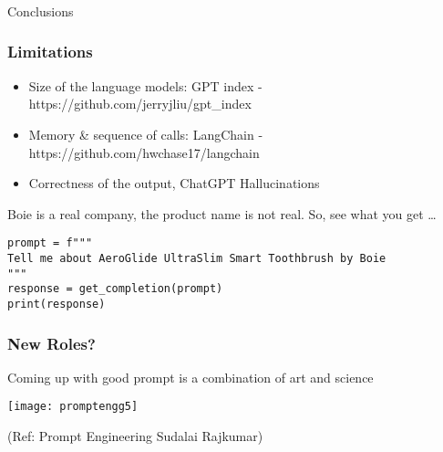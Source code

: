 

\begin{frame}[fragile]\frametitle{}
\begin{center}
{\Large Conclusions}
\end{center}
\end{frame}

\begin{frame}[fragile]\frametitle{Limitations}


\begin{itemize}
\item Size of the language models: GPT index - https://github.com/jerryjliu/gpt\_index
\item Memory \& sequence of calls: LangChain - https://github.com/hwchase17/langchain
\item Correctness of the output, ChatGPT Hallucinations
\end{itemize}	 

Boie is a real company, the product name is not real. So, see what you get \ldots

\begin{lstlisting}
prompt = f"""
Tell me about AeroGlide UltraSlim Smart Toothbrush by Boie
"""
response = get_completion(prompt)
print(response)
\end{lstlisting}	 
		
\end{frame}



\begin{frame}[fragile]\frametitle{New Roles?}

Coming up with good prompt is a combination of art and science

\begin{center}
\texttt{[image: promptengg5]}

{\tiny (Ref: Prompt Engineering Sudalai Rajkumar)}

\end{center}		
		


\end{frame}


